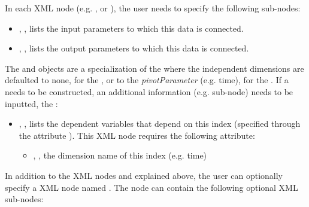 \vspace{-5mm}
In each XML node (e.g. ,  or  ), the user
needs to specify the following sub-nodes:
\begin{itemize}
  \item {}, , lists
  the input parameters to which this data is connected.
  \item {}, , lists
  the output parameters to which this data is connected.
\end{itemize}

The   and   objects are a specialization of the   where the 
independent dimensions are defaulted to none, for the , or to the \textit{pivotParameter} (e.g. time), for the .
If a   needs to be constructed, an additional information (e.g. sub-node) needs to be inputted, the  :

\begin{itemize}
  \item {}, , lists
  the dependent variables that depend on this index (specified through the attribute  ).
  This XML node requires the following attribute:
   \begin{itemize}
       \item {}, , the dimension name of this index (e.g. time)
   \end{itemize}
\end{itemize}


In addition to the XML nodes  and  explained above, the user
can optionally specify a XML node named  . The   node can
contain the following optional XML sub-nodes:

